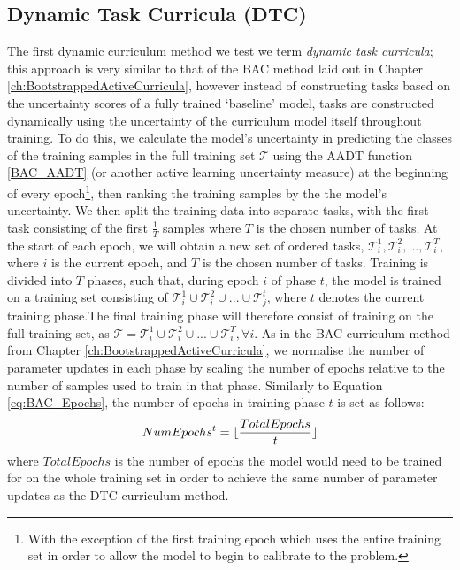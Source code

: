 \subsection{Dynamic Task Curricula (DTC)}\label{sec:DTC}
The first dynamic curriculum method we test we term \textit{dynamic task curricula}; this approach is very similar to that of the BAC method laid out in Chapter \ref{ch:BootstrappedActiveCurricula}, however instead of constructing tasks based on the uncertainty scores of a fully trained `baseline' model, tasks are constructed dynamically using the uncertainty of the curriculum model itself throughout training. To do this, we calculate the model's uncertainty in predicting the classes of the training samples in the full training set $\mathcal{T}$ using the AADT function \ref{BAC_AADT} (or another active learning uncertainty measure) at the beginning of every epoch\footnote{With the exception of the first training epoch which uses the entire training set in order to allow the model to begin to calibrate to the problem.}, then ranking the training samples by the the model's uncertainty. We then split the training data into separate tasks, with the first task consisting of the first $\frac{1}{T}$ samples where $T$ is the chosen number of tasks. At the start of each epoch, we will obtain a new set of ordered tasks, $\mathcal{T}_i^1, \mathcal{T}_i^2,...,\mathcal{T}_i^T$, where $i$ is the current epoch, and $T$ is the chosen number of tasks. Training is divided into $T$ phases, such that, during epoch $i$ of phase $t$, the model is trained on a training set consisting of $\mathcal{T}_i^1 \cup \mathcal{T}_i^2 \cup ... \cup \mathcal{T}_j^t$, where $t$ denotes the current training phase.The final training phase will therefore consist of training on the full training set, as $\mathcal{T} = \mathcal{T}_i^1 \cup \mathcal{T}_i^2 \cup ... \cup \mathcal{T}_i^T, \forall  i$. As in the BAC curriculum method from Chapter \ref{ch:BootstrappedActiveCurricula}, we normalise the number of parameter updates in each phase by scaling the number of epochs relative to the number of samples used to train in that phase. Similarly to Equation \ref{eq:BAC_Epochs}, the number of epochs in training phase $t$ is set as follows:
\begin{equation}\label{eq:DTC_Epochs}
NumEpochs^{t} =\lfloor \frac{TotalEpochs}{t}\rfloor
\end{equation}
where $TotalEpochs$ is the number of epochs the model would need to be trained for on the whole training set in order to achieve the same number of parameter updates as the DTC curriculum method.


